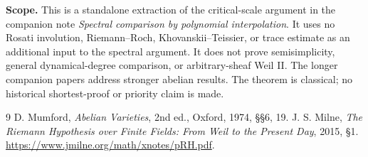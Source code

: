 \documentclass[11pt]{article}
\begin{document}
\smallskip\noindent\textbf{Scope.}
This is a standalone extraction of the critical-scale argument in the
companion note \emph{Spectral comparison by polynomial interpolation}.
It uses no Rosati involution, Riemann--Roch, Khovanskii--Teissier, or trace
estimate as an additional input to the spectral argument. It does not prove
semisimplicity, general dynamical-degree comparison, or arbitrary-sheaf
Weil II. The longer companion papers address stronger abelian results.
The theorem is classical; no historical shortest-proof or priority claim is made.

\begingroup\small\setlength{\itemsep}{0pt}\begin{thebibliography}{9}
 D. Mumford, \emph{Abelian Varieties}, 2nd ed., Oxford, 1974, \S\S6, 19.
 J. S. Milne, \emph{The Riemann Hypothesis over Finite Fields: From Weil to the Present Day}, 2015, \S1. \url{https://www.jmilne.org/math/xnotes/pRH.pdf}.
\end{thebibliography}\endgroup
\end{document}
